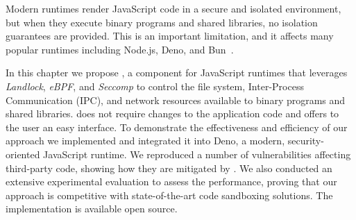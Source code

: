 Modern runtimes render JavaScript code in a secure and isolated
environment, but when they execute binary programs and shared
libraries, no isolation guarantees are provided. This is an important
limitation, and it affects many popular runtimes including Node.js,
Deno, and Bun~\cite{node-permissions,deno-permissions}.

In this chapter we propose \natisand, a component for JavaScript runtimes
that leverages {\em Landlock}, {\em eBPF}, and {\em Seccomp} to
control the file system, Inter-Process Communication (IPC), and network
resources available to binary programs and shared libraries.  \natisand
does not require changes to the application code and offers to the
user an easy interface.
%
To demonstrate the effectiveness and efficiency of our approach we
implemented \natisand and integrated it into Deno, a modern,
security-oriented JavaScript runtime. We reproduced a number of
vulnerabilities affecting third-party code, showing how they are
mitigated by \natisand. We also conducted an extensive experimental
evaluation to assess the performance, proving that our approach is
competitive with state-of-the-art code sandboxing solutions. The
implementation is available open source.

